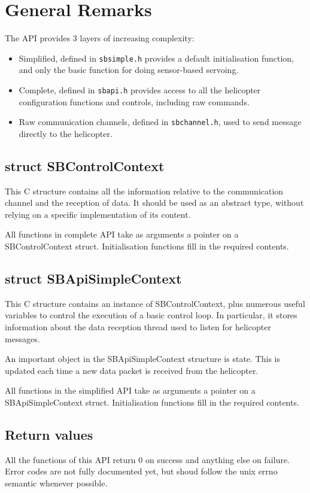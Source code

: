 \documentclass{article}
\begin{document}
\section{General Remarks}
The API provides 3 layers of increasing complexity:
\begin{itemize}
\item Simplified, defined in {\tt sbsimple.h} provides a default initialisation
function, and only the basic function for doing sensor-based servoing. 
\item Complete, defined in {\tt sbapi.h} provides access to all the helicopter
configuration functions and controls, including raw commands. 
\item Raw communication channels, defined in {\tt sbchannel.h}, used to send
message directly to the helicopter. 
\end{itemize}


\subsection{struct SBControlContext}
\label{sec:structSBControlContext}
This C structure contains all the information relative to the communication
channel and the reception of data. It should be used as an abstract type,
without relying on a specific implementation of its content.

All functions in complete API take as arguments a pointer on a SBControlContext
struct. Initialisation functions fill in the required contents. 

\subsection{struct SBApiSimpleContext}
\label{sec:structSBApiSimpleContext}
This C structure contains an instance of SBControlContext, plus numerous useful
variables to control the execution of a basic control loop. In particular, it
stores information about the data reception thread used to listen for
helicopter messages.

An important object in the SBApiSimpleContext structure is state. This is
updated each time a new data packet is received from the helicopter. 

All functions in the simplified API take as arguments a pointer on a
SBApiSimpleContext struct. Initialisation functions fill in the required contents. 

\subsection{Return values}
\label{sec:returnValues}
All the functions of this API return 0 on success and anything else on failure. 
Error codes are not fully documented yet, but shoud follow the unix errno
semantic whenever possible. 
\end{document}
